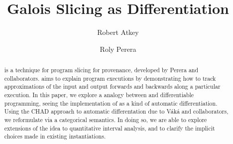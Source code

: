\documentclass[acmsmall,screen,anonymous]{acmart}
\begin{document}
\title{Galois Slicing as Differentiation}

\author{Robert Atkey}

\author{Roly Perera}

\begin{abstract}
  \GPS is a technique for program slicing for provenance, developed by
  Perera and collaborators. \GPS aims to explain program executions by
  demonstrating how to track approximations of the input and output
  forwards and backwards along a particular execution. In this paper,
  we explore a analogy between \GPS and differentiable programming,
  seeing the implementation of \GPS as a kind of automatic
  differentiation. Using the CHAD approach to automatic differentation
  due to V{\'a}k{\'a} and collaborators, we reformulate \GPS via a
  categorical semantics. In doing so, we are able to explore
  extensions of the \GPS idea to quantitative interval analysis, and
  to clarify the implicit choices made in existing \GPS
  instantiations.
\end{abstract}
\maketitle












% 
\end{document}
